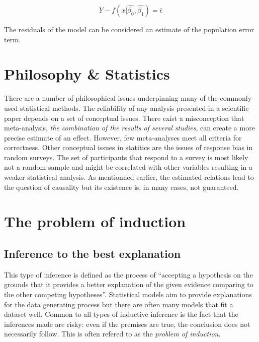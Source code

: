 \documentclass{article}
\begin{document}
$$
    Y - f(x | \hat{\beta_{0}}, \hat{\beta_{1}}) = \bar{\epsilon}
$$

The residuals of the model can be considered an estimate of the population error term.

\section{Philosophy \& Statistics}

There are a number of philosophical issues underpinning many of the commonly-used
statistical methods. The reliability of any analysis presented in a scientific paper
depends on a set of conceptual issues. There exist a misconception that meta-analysis,
\textit{the combination of the results of several studies}, can create a more precise
estimate of an effect. However, few meta-analyses meet all criteria for correctness.
Other conceptual issues in statitics are the issues of response bias in random surveys.
The set of participants that respond to a survey is most likely not a random sample and
might be correlated with other variables resulting in a weaker statistical analysis. As
mentionned earlier, the estimated relations lead to the question of causality but its
existence is, in many cases, not guaranteed.

\section{The problem of induction}
\subsection{Inference to the best explanation}

This type of inference is defined as the  process of “accepting a hypothesis on the
grounds that it provides a better explanation of the given evidence comparing to
the other competing hypotheses”. Statistical models aim to provide explanations for
the data generating process but there are often many models that fit a dataset well.
Common to all types of inductive inference is the fact that the inferences made are
risky: even if the premises are true, the conclusion does not necessarily follow.
This is often refered to as the \textit{problem of induction}.
\end{document}
